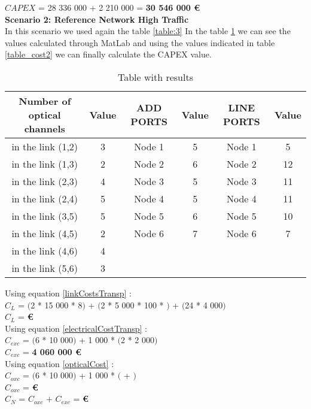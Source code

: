 $CAPEX$ = 28 336 000 + 2 210 000 = \textbf{30 546 000 \euro}\\

\textbf{Scenario 2: Reference Network High Traffic} \label{Scenario2_transp} \\
In this scenario we used again the table \ref{table:3} In the table \ref{result_ILP2_T} we can see the values calculated through MatLab and using the values indicated in table \ref{table_cost2} we can finally calculate the CAPEX value.

\begin{table}[h!]
\centering
\begin{tabular}{|| c | c || c | c || c | c ||}
 \hline
 Number of optical channels & Value & ADD PORTS & Value & LINE PORTS & Value \\
 \hline\hline
 in the link (1,2) & 3 & Node 1 & 5 & Node 1 & 5 \\
 in the link (1,3) & 2 & Node 2 & 6 & Node 2 & 12 \\
 in the link (2,3) & 4 & Node 3 & 5 & Node 3 & 11 \\
 in the link (2,4) & 5 & Node 4 & 5 & Node 4 & 11 \\
 in the link (3,5) & 5 & Node 5 & 6 & Node 5 & 10 \\
 in the link (4,5) & 2 & Node 6 & 7 & Node 6 & 7 \\
 in the link (4,6) & 4 & & & & \\
 in the link (5,6) & 3 & & & & \\
 \hline
\end{tabular}
\caption{Table with results}
\label{result_ILP2_T}
\end{table}


Using equation \ref{linkCostsTransp} : \\
$C_L$ = $($2 * 15 000 * 8$)$ + $($2 * 5 000 * 100 * $)$ + $($24 * 4 000$)$ \\
$C_L$ = \textbf{ \euro} \\

Using equation \ref{electricalCostTransp} : \\
$C_{exc}$ = $($6 * 10 000$)$ + 1 000 * $($2 * 2 000$)$ \\
$C_{exc}$ = \textbf{4 060 000 \euro} \\

Using equation \ref{opticalCost} : \\
$C_{oxc}$ = $($6 * 10 000$)$ + 1 000 * $($ + $)$ \\
$C_{oxc}$ = \textbf{ \euro} \\
$C_N$ = $C_{oxc}$ + $C_{exc}$ = \textbf{ \euro} \\

